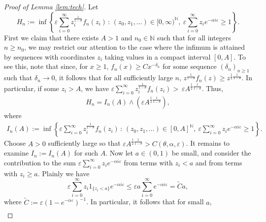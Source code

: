 \documentclass[a4,12pt]{amsart}
\numberwithin{equation}{section}
\begin{document}
\begin{appendix}
	\begin{proof}[Proof of Lemma \ref{lem:tech}]
		Let 
		\begin{equation*}
			H_n :=  \inf\left\{  \varepsilon  
			\sum_{i=0}^{\infty} z_i^{\frac{1}{1-\theta}}f_n(z_i) \,:\, 
			(z_0,z_1,\ldots)\in[0,\infty)^{\mathbb{N}}, \: 
			\varepsilon \sum_{i=0}^{\infty} z_ie^{ - \alpha i \varepsilon} \geq 1 \right\}.
		\end{equation*}
		First we claim that there exists $A > 1$ and $n_0\in\mathbb N$ such that for all integers $ n \geq n_0$, 
		we may restrict our attention
		to the case where the infimum is attained by 
		sequences with coordinates $z_i$ taking values in a compact interval 
		$[0,A]$. To see this, note that since, for $x \geq 1$, 
		$f_n(x) \geq C x^{- \delta_n}$ for some sequence 
		$(\delta_n)_{n \geq 1}$ such that $\delta_n \to 0$, it follows that 
		for all sufficiently large $n$, 
		$z^{\frac{1}{1-\theta}}f_n(z) \geq z^{ \frac{1}{2} \frac{1}{1-\theta} }$. 
		In particular, if some $z_i > A$, we have 
		$\varepsilon \sum_{i=0}^\infty z_i^{\frac{1}{1-\theta}} f_n(z_i) > \
		\varepsilon A^{\frac{1}{2}\frac{1}{1-\theta}}$. Thus,
		\begin{align*}
			H_n = I_n(A) \wedge \left( \varepsilon A^{\frac{1}{2}\frac{1}{1-\theta}} \right),
		\end{align*}
		where 
		\begin{align} \label{eq:pickap}
			 I_n(A) := 
			\inf\left\{  \varepsilon  
			\sum_{i=0}^{\infty} z_i^{\frac{1}{1-\theta}}f_n(z_i) 
			\,:\,(z_0,z_1,\ldots)\in[0,A]^{\mathbb{N}}, \: 
			\varepsilon \sum_{i=0}^{\infty} z_ie^{ - \alpha i \varepsilon} 
			\geq 1\right\} .
		\end{align}
		Choose $A>0$ sufficiently large so that 
		$\varepsilon A^{\frac{1}{2}\frac{1}{1-\theta}} > C(\theta,\alpha,\varepsilon)$. 
		It remains to examine $I_n:=I_n(A)$ for such $A$. 
		Now let $a \in (0,1)$ be small, and consider the contribution to the sum 
		$\varepsilon \sum_{i=0}^\infty z_i e^{ - \alpha i \varepsilon }$ 
		from terms with $z_i < a$ and from terms with $z_i \geq a$. 
		Plainly we have 
		\begin{equation*}
			\varepsilon \sum_{i=0}^\infty 
			z_i \mathrm{1}_{\{z_i < a\}}e^{ - \alpha i \varepsilon } 
			\leq \varepsilon a \sum_{i=0}^\infty e^{ - \alpha i \varepsilon } 
			= \tilde{C}a,
		\end{equation*}
		where $\tilde{C}:=\varepsilon  (1- e^{ - \alpha \varepsilon })^{-1}$. 
		In particular, it follows that for small $a$,
		\begin{align*}

\end{align*}
\end{proof}
\end{appendix}
\end{document}

